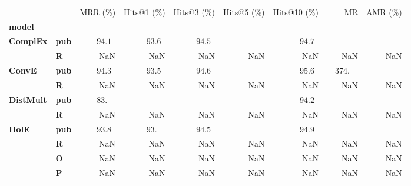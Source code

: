 \begin{tabular}{llrrrrrrr}
\toprule
       &   &           MRR (\%) &        Hits@1 (\%) &        Hits@3 (\%) & Hits@5 (\%) &       Hits@10 (\%) &                              MR & AMR (\%) \\
\textbf{model} & {} &                    &                    &                    &             &                    &                                 &          \\
\midrule
\textbf{ComplEx} & \textbf{pub} &  $94.1\phantom{0}$ &  $93.6\phantom{0}$ &  $94.5\phantom{0}$ &             &  $94.7\phantom{0}$ &                                 &          \\
       & \textbf{R} &                NaN &                NaN &                NaN &         NaN &                NaN &                             NaN &      NaN \\\midrule
\textbf{ConvE} & \textbf{pub} &  $94.3\phantom{0}$ &  $93.5\phantom{0}$ &  $94.6\phantom{0}$ &             &  $95.6\phantom{0}$ &  $\phantom{00}374.\phantom{00}$ &          \\
       & \textbf{R} &                NaN &                NaN &                NaN &         NaN &                NaN &                             NaN &      NaN \\\midrule
\textbf{DistMult} & \textbf{pub} &  $83.\phantom{00}$ &                    &                    &             &  $94.2\phantom{0}$ &                                 &          \\
       & \textbf{R} &                NaN &                NaN &                NaN &         NaN &                NaN &                             NaN &      NaN \\\midrule
\textbf{HolE} & \textbf{pub} &  $93.8\phantom{0}$ &  $93.\phantom{00}$ &  $94.5\phantom{0}$ &             &  $94.9\phantom{0}$ &                                 &          \\
       & \textbf{R} &                NaN &                NaN &                NaN &         NaN &                NaN &                             NaN &      NaN \\
       & \textbf{O} &                NaN &                NaN &                NaN &         NaN &                NaN &                             NaN &      NaN \\
       & \textbf{P} &                NaN &                NaN &                NaN &         NaN &                NaN &                             NaN &      NaN \\\midrule

\end{tabular}
